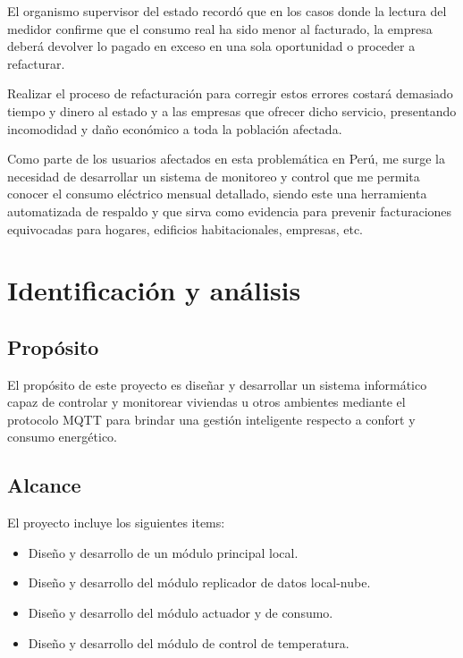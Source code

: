 El organismo supervisor del estado recordó que en los casos donde la lectura del medidor confirme que el consumo real ha sido menor al facturado, la empresa deberá devolver lo pagado en exceso en una sola oportunidad o proceder a refacturar.

Realizar el proceso de refacturación para corregir estos errores costará demasiado tiempo y dinero al estado y a las empresas que ofrecer dicho servicio, presentando incomodidad y daño económico a toda la población afectada. 

Como parte de los usuarios afectados en esta problemática en Perú, me surge la necesidad de desarrollar un sistema de monitoreo y control que me permita conocer el consumo eléctrico mensual detallado, siendo este una herramienta automatizada de respaldo y que sirva como evidencia para prevenir facturaciones equivocadas para hogares, edificios habitacionales, empresas, etc.


\section{Identificación y análisis}



\subsection{Propósito}

El propósito de este proyecto es diseñar y desarrollar un sistema informático capaz de controlar y monitorear viviendas u otros ambientes mediante el protocolo MQTT para brindar una gestión inteligente respecto a confort y consumo energético.

\subsection{Alcance}

El proyecto incluye los siguientes items:
\begin{itemize}
\item Diseño y desarrollo de un módulo principal local.
\item Diseño y desarrollo del módulo replicador de datos local-nube.
\item Diseño y desarrollo del módulo actuador y de consumo.
\item Diseño y desarrollo del módulo de control de temperatura.
\end{itemize}

